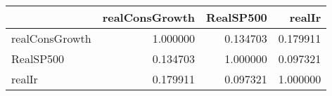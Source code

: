 \begin{tabular}{lrrr}
\toprule
{} &  realConsGrowth &  RealSP500 &    realIr \\
\midrule
realConsGrowth &        1.000000 &   0.134703 &  0.179911 \\
RealSP500      &        0.134703 &   1.000000 &  0.097321 \\
realIr         &        0.179911 &   0.097321 &  1.000000 \\
\bottomrule
\end{tabular}
